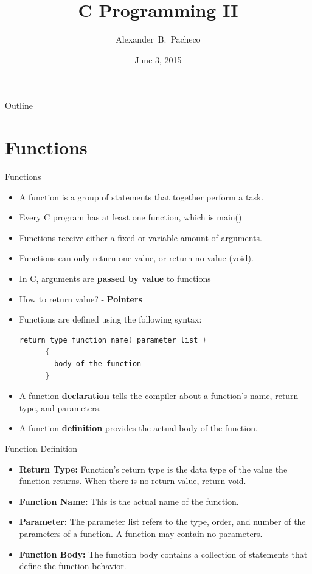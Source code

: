 \documentclass[10pt,t]{beamer}
\title{C Programming II}
\author[Alex Pacheco]{\large{Alexander~B.~Pacheco}}
\institute{\href{http://researchcomputing.lehigh.edu}{LTS Research Computing}}
\date{June 3, 2015}
\begin{document}
\frame{\titlepage}

\begin{frame}{Outline}
  \tableofcontents
\end{frame}

\section{Functions}
\begin{frame}[fragile]{Functions}
  \begin{itemize}
  \item A function is a group of statements that together perform a task.
  \item Every C program has at least one function, which is main()
  \item Functions receive either a fixed or variable amount of arguments.
  \item Functions can only return one value, or return no value (void).
  \item In C, arguments are \textbf{passed by value} to functions
  \item How to return value? - \textbf{Pointers}
  \item Functions are defined using the following syntax:
    \begin{lstlisting}[language=C,basicstyle=\scriptsize\ttfamily]
      return_type function_name( parameter list )
      {
        body of the function
      }
    \end{lstlisting}
  \item A function \textbf{declaration} tells the compiler about a function's name, return type, and parameters.
  \item A function \textbf{definition} provides the actual body of the function.
  \end{itemize}
\end{frame}

\begin{frame}[fragile]{Function Definition}
  \begin{itemize}
  \item \textbf{Return Type:} Function's return type is the data type of the value the function returns. When there is no return value, return void.
  \item \textbf{Function Name:} This is the actual name of the function.
  \item \textbf{Parameter:} The parameter list refers to the type, order, and number of the parameters of a function. A function may contain no parameters.
  \item \textbf{Function Body:} The function body contains a collection of statements that define the function behavior.
  \end{itemize}
  
\end{frame}
\end{document}
